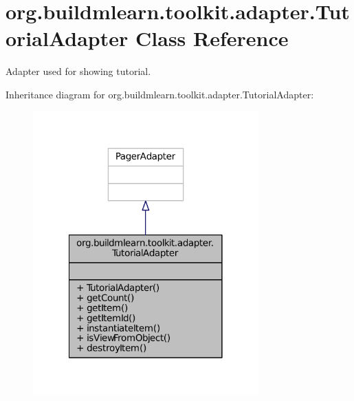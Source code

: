 \hypertarget{classorg_1_1buildmlearn_1_1toolkit_1_1adapter_1_1TutorialAdapter}{\section{org.\-buildmlearn.\-toolkit.\-adapter.\-Tutorial\-Adapter Class Reference}
\label{classorg_1_1buildmlearn_1_1toolkit_1_1adapter_1_1TutorialAdapter}
}


Adapter used for showing tutorial.  




Inheritance diagram for org.\-buildmlearn.\-toolkit.\-adapter.\-Tutorial\-Adapter\-:
\nopagebreak
\begin{figure}[H]
\begin{center}
\leavevmode
\includegraphics[width=246pt]{df/d4a/classorg_1_1buildmlearn_1_1toolkit_1_1adapter_1_1TutorialAdapter__inherit__graph}
\end{center}
\end{figure}



